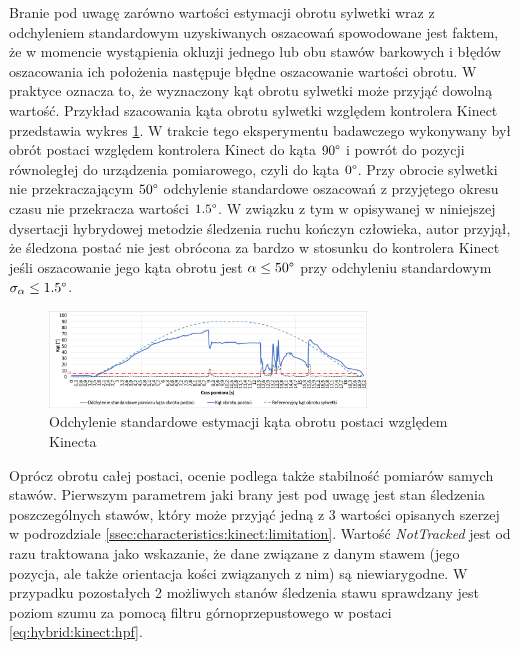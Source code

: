 Branie pod uwagę zarówno wartości estymacji obrotu sylwetki 
wraz z odchyleniem standardowym uzyskiwanych oszacowań spowodowane jest faktem, że w momencie wystąpienia okluzji jednego lub obu stawów barkowych i błędów oszacowania ich położenia następuje błędne oszacowanie wartości obrotu. W praktyce oznacza to, że wyznaczony kąt obrotu sylwetki może przyjąć dowolną wartość. Przykład szacowania kąta obrotu sylwetki względem kontrolera Kinect przedstawia wykres \ref{fig:hybrid:kinect:kinectRotationVariance}. W trakcie tego eksperymentu badawczego wykonywany był obrót postaci względem kontrolera Kinect do kąta $90\degree$ i powrót do pozycji równoległej do urządzenia pomiarowego, czyli do kąta $0\degree$. Przy obrocie sylwetki nie przekraczającym $50\degree$ odchylenie standardowe oszacowań z przyjętego okresu czasu nie przekracza wartości $1.5\degree$. W związku z tym w opisywanej w niniejszej dysertacji hybrydowej metodzie śledzenia ruchu kończyn człowieka, autor przyjął, że śledzona postać nie jest obrócona za bardzo w stosunku do kontrolera Kinect jeśli oszacowanie jego kąta obrotu jest $\alpha \le 50\degree$ przy odchyleniu standardowym $\sigma_\alpha\le 1.5 \degree$.

\begin{figure}[!htp]
	\centering
						
	\includegraphics[width=0.75\textwidth]{images/kinectRotationStdDev.png}
	\caption{Odchylenie standardowe estymacji kąta obrotu postaci względem Kinecta}
					
	\label{fig:hybrid:kinect:kinectRotationVariance}
\end{figure}

Oprócz obrotu całej postaci, ocenie podlega także stabilność pomiarów samych stawów. Pierwszym parametrem jaki brany jest pod uwagę jest stan śledzenia poszczególnych stawów, który może przyjąć jedną z 3 wartości opisanych szerzej w podrozdziale \ref{ssec:characteristics:kinect:limitation}. Wartość \emph{NotTracked} jest od razu traktowana jako wskazanie, że dane związane z danym stawem (jego pozycja, ale także orientacja kości związanych z nim) są niewiarygodne. W przypadku pozostałych 2 możliwych stanów śledzenia stawu sprawdzany jest poziom szumu za pomocą filtru górnoprzepustowego w postaci \eqref{eq:hybrid:kinect:hpf}. 

